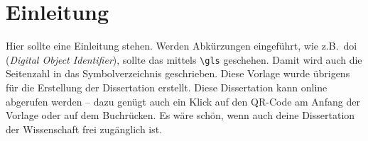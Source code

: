 
\chapter{Einleitung}
\label{sec:Einleitung}

Hier sollte eine Einleitung stehen. Werden Abkürzungen eingeführt, wie z.B.\ \gls{doi} (\textit{Digital Object Identifier}), sollte das mittels \texttt{\textbackslash gls} geschehen. Damit wird auch die Seitenzahl in das Symbolverzeichnis geschrieben. Diese Vorlage wurde übrigens für die Erstellung der Dissertation \cite{Paris2020} erstellt. Diese Dissertation kann online abgerufen werden -- dazu genügt auch ein Klick auf den QR-Code am Anfang der Vorlage oder auf dem Buchrücken. Es wäre schön, wenn auch deine Dissertation der Wissenschaft frei zugänglich ist.

